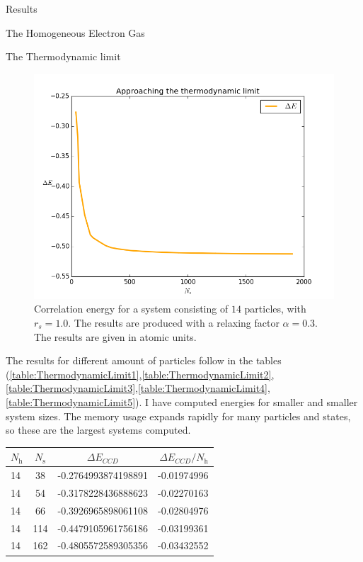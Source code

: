 \documentclass[twoside,english]{uiofysmaster}
\begin{document}
\begin{chapter}{Results}
\begin{section}{The Homogeneous Electron Gas}
\begin{subsection}{The Thermodynamic limit}
			\begin{figure}[H]
				\includegraphics[width=\textwidth]{../ElectronGas/Results/Figures/Thermodynamic_limit.png}
				\caption{Correlation energy for a system consisting of $14$ particles, with $r_s=1.0$. The results are produced with a relaxing factor $\alpha=0.3$. The results are given in atomic units.}
				\label{figure:thermodynamic_limit}
			\end{figure}
			The results for different amount of particles follow in the tables \newline (\ref{table:ThermodynamicLimit1},\ref{table:ThermodynamicLimit2},\ref{table:ThermodynamicLimit3},\ref{table:ThermodynamicLimit4},\ref{table:ThermodynamicLimit5}). I have computed energies for smaller and smaller system sizes. The memory usage expands rapidly for many particles and states, so these are the largest systems computed. 
			\begin{table}[H]
				\begin{center}
					\begin{tabular}[center]{l  c  c r}
						$N_{\text{h}}$ & $N_{\text{s}}$ & $\Delta E_{CCD}$ & $\Delta E_{CCD}/N_{\text{h}}$ \\
						\hline
						14 &  38 & -0.2764993874198891 & -0.01974996 \\
						14 &  54 & -0.3178228436888623 & -0.02270163\\ 
						14 &  66 & -0.3926965898061108 & -0.02804976\\
						14 & 114 & -0.4479105961756186 & -0.03199361 \\
						14 & 162 & -0.4805572589305356 & -0.03432552\\

\end{tabular}
\end{center}
\end{table}
\end{subsection}
\end{section}
\end{chapter}
\end{document}
